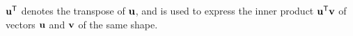 \documentclass{article}
\newcommand\discard[1]{}
\begin{document}
$\mathbf{u}^{\sf T}$ denotes the transpose of $\mathbf{u}$, and is used to
express the inner product $\mathbf{u}^{\sf T} \mathbf{v}$ of vectors $\mathbf{u}$ and
$\mathbf{v}$ of the same shape.

%
\discard{
    \color{gray!30!white} If $\mat u = [u_a]_{a \in A}$ is a vector over $A$ and $\mat v = [v_b]_{b \in B}$ is a vector over $B$, then $\mat u \mathbin{\otimes} \mat v := [ u_a \cdot v_b ]_{a \in A, b \in B}$ is a vector over $A \times B$. }
\end{document}
